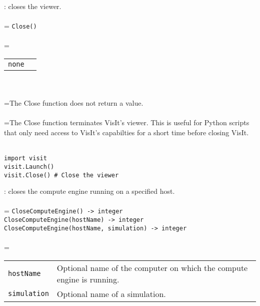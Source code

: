 \documentclass[10pt,a4paper]{report}
\begin{document}
{}
: closes the viewer.\\[-3mm]

 \\ 
\hangindent=\parindent 
\verb!Close()!\\ [-3mm]

 \\ 
\hangindent=\parindent 
\begin{tabular}{ll}
\verb!none! &  \\
\end{tabular} \\[-2mm]


 \\ 
\hangindent=\parindent The Close function does not return a value. \\[-3mm] 

 \\ 
\hangindent=\parindent The Close function terminates VisIt's viewer. This is useful for Python scripts that only need access to VisIt's capabilties for a short time before closing VisIt. \\[-3mm] 

\\[-6mm]
\begin{verbatim}import visit
visit.Launch()
visit.Close() # Close the viewer
\end{verbatim}
\newpage


{}
: closes the compute engine running on a specified host.\\[-3mm]

 \\ 
\hangindent=\parindent 
\verb!CloseComputeEngine() -> integer!\\ 
\verb!CloseComputeEngine(hostName) -> integer!\\ 
\verb!CloseComputeEngine(hostName, simulation) -> integer!\\ [-3mm]

 \\ 
\hangindent=\parindent 
\begin{tabular}{lp{9cm}}
\verb!hostName! & Optional name of the computer on which the compute engine is running. \\
\verb!simulation! & Optional name of a simulation. \\
\end{tabular} \\[-2mm]
\end{document}
